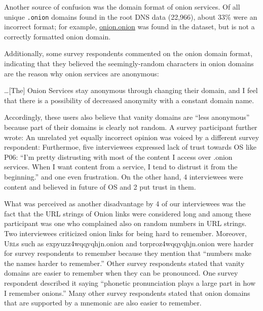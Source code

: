 Another source of confusion was the domain format of onion services.  Of all unique {\tt .onion} 
domains found in the root DNS data (22,966), about 33\% were an incorrect format; for example, 
\url{onion.onion} was found in the dataset, but is not a correctly formatted onion domain.

Additionally, some survey respondents commented on the onion domain format, indicating that they believed the seemingly-random
characters in onion domains are the reason why onion services are anonymous:

\begin{displayquote}
\ldots [The] Onion Services stay anonymous through changing their domain, and I
feel that there is a possibility of decreased anonymity with a constant domain
name.
\end{displayquote}

Accordingly, these users also believe that vanity domains  are ``less anonymous''
because part of their domains is clearly not random.  A survey participant
further wrote:   An unrelated yet
equally incorrect opinion was voiced by a different survey respondent:
 Furthermoe, five interviewees expressed lack of trust towards OS like P06: “I'm pretty distrusting with most of the content I access over .onion services. When I want content from a service, I tend to distrust it from the beginning.” and one even frustration. On the other hand, 4 interviewees were content and believed in future of OS and 2 put trust in them.

What was perceived as another disadvantage by 4 of our interviewees was the fact that the URL strings of Onion links were considered long and among these participant was one who complained also on random numbers in URL strings. Two interviewees criticized onion links for being hard to remember. Moreover, \textsc{Url}s such as expyuzz4wqqyqhjn.onion and torproz4wqqyqhjn.onion were
harder for survey respondents to remember because they mention that ``numbers make the
names harder to remember.''  Other survey respondents stated that vanity domains are easier to
remember when they can be pronounced.  One survey respondent described it saying 
``phonetic pronunciation plays a large part in how I remember onions.'' Many
other survey  respondents stated that onion domains that are supported by a mnemonic are
also easier to remember.  
 

